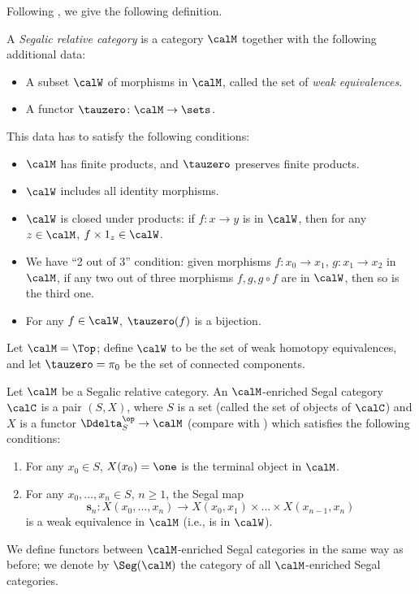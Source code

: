 Following , we give the following definition.

\begin{definition}
  A \emph{Segalic relative category} is a category $\calM$ together with the
  following additional data:
  \begin{itemize}
    \item A subset $\calW$ of morphisms in $\calM$, called the set of
      \emph{weak equivalences}.
    \item A functor $\tauzero\colon \calM\to \sets$.
  \end{itemize}
  This data has to satisfy the following conditions:
  \begin{itemize}
    \item $\calM$ has finite products, and $\tauzero$ preserves finite
      products.
    \item $\calW$ includes all identity morphisms.
    \item $\calW$ is closed under products: if $f\colon x\to y$ is in $\calW$,
      then for any $z\in \calM$, $f\times 1_z\in \calW$.
    \item We have ``2 out of 3'' condition: given morphisms $f\colon x_0\to
      x_1$, $g\colon x_1\to x_2$ in $\calM$, if any two out of three morphisms
      $f, g, g\circ f$ are in $\calW$, then so is the third one.
    \item For any $f\in \calW$, $\tauzero(f)$ is a bijection.
  \end{itemize}
\end{definition}

\begin{example}\label{x:top-weak-equiv}
  Let $\calM=\Top$; define $\calW$ to be the set of weak homotopy equivalences,
  and let $\tauzero=\pi_0$ be the set of connected components.
\end{example}



\begin{definition}\label{d:segal-enriched}
  Let $\calM$ be a Segalic relative category. An $\calM$-enriched Segal category
  $\calC$ is a pair $(S,X)$, where $S$ is a set (called the set of objects of
  $\calC$) and $X$ is a functor $\Ddelta_S^\op\to \calM$ (compare with
  ) which satisfies the following conditions:
    \begin{enumerate}
      \item For any $x_0\in S$, $X(x_0)=\one$ is the terminal object in $\calM$.
      \item For any $x_0, \dots, x_n \in S$, $n\ge 1$, the Segal map
      $$
         \mathbf{s}_n\colon X(x_0, \dots, x_n)\to
                X(x_0, x_1)\times \dots\times X(x_{n-1}, x_n)
      $$
      is a weak equivalence in $\calM$ (i.e., is in $\calW$).
    \end{enumerate}

    We define functors between $\calM$-enriched Segal categories in the same way
    as before; we denote by $\Seg(\calM)$ the category of all $\calM$-enriched
    Segal categories.
\end{definition}

